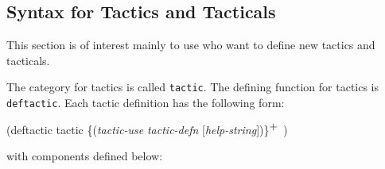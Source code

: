 \subsection{Syntax for Tactics and Tacticals}
This section is of interest mainly to use who want to define new
tactics and tacticals.

The {\TPS} category for tactics is called {\tt tactic}.  The defining
function for tactics is {\tt deftactic}.  Each tactic definition has
the following form:

\begin{lispcode}
(deftactic tactic
  \{({\it tactic-use} {\it tactic-defn} [{\it help-string}])\}$^{\hbox{+}}$
)
\end{lispcode}

with components defined below:



